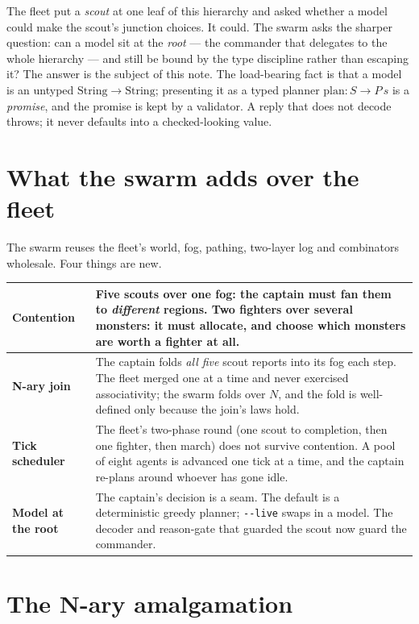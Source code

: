 \documentclass[11pt]{article}
\newcommand{\code}[1]{\texttt{#1}}
\begin{document}
The fleet put a \emph{scout} at one leaf of this hierarchy and asked whether a model
could make the scout's junction choices. It could. The swarm asks the sharper
question: can a model sit at the \emph{root} --- the commander that delegates to the
whole hierarchy --- and still be bound by the type discipline rather than escaping it?
The answer is the subject of this note. The load-bearing fact is that a model is an
untyped $\mathrm{String} \to \mathrm{String}$; presenting it as a typed planner
$\mathrm{plan} : S \to P\,s$ is a \emph{promise}, and the promise is kept by a
validator. A reply that does not decode throws; it never defaults into a
checked-looking value.

\section{What the swarm adds over the fleet}

The swarm reuses the fleet's world, fog, pathing, two-layer log and combinators
wholesale. Four things are new.

\begin{center}
\begin{tabularx}{\linewidth}{@{}>{\bfseries}l X@{}}
\toprule
Contention & Five scouts over one fog: the captain must fan them to \emph{different}
regions. Two fighters over several monsters: it must allocate, and choose which
monsters are worth a fighter at all.\\
\midrule
N-ary join & The captain folds \emph{all five} scout reports into its fog each step.
The fleet merged one at a time and never exercised associativity; the swarm folds over
$N$, and the fold is well-defined only because the join's laws hold.\\
\midrule
Tick scheduler & The fleet's two-phase round (one scout to completion, then one
fighter, then march) does not survive contention. A pool of eight agents is advanced
one tick at a time, and the captain re-plans around whoever has gone idle.\\
\midrule
Model at the root & The captain's decision is a seam. The default is a deterministic
greedy planner; \code{-{}-live} swaps in a model. The decoder and reason-gate that
guarded the scout now guard the commander.\\
\bottomrule
\end{tabularx}
\end{center}

\section{The N-ary amalgamation}
\end{document}
